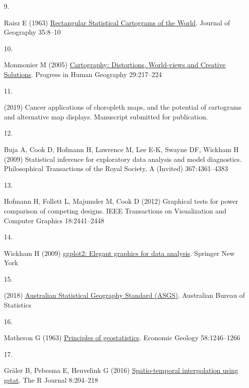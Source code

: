 \documentclass[conference,final,]{IEEEtran}
\newlength{\cslhangindent}
\newlength{\csllabelwidth}
\newlength{\cslentryspacingunit} %
\newenvironment{CSLReferences}[2] %
 {%
  \setlength{\parindent}{0pt}
  \ifodd #1
  \let\oldpar\par
  \def\par{\hangindent=\cslhangindent\oldpar}
  \fi
  \setlength{\parskip}{#2\cslentryspacingunit}
 }%
 {}
\newcommand{\CSLLeftMargin}[1]{\parbox[t]{\csllabelwidth}{#1}}
\newcommand{\CSLRightInline}[1]{\parbox[t]{\linewidth - \csllabelwidth}{#1}\break}
\begin{document}
\begin{CSLReferences}{0}{0}
\leavevmode{}%
\CSLLeftMargin{9. }%
\CSLRightInline{Raisz E (1963) \href{https://doi.org/10.1080/00221343608987880}{{Rectangular Statistical Cartograms of the World}}. Journal of Geography 35:8--10}

\leavevmode{}%
\CSLLeftMargin{10. }%
\CSLRightInline{Monmonier M (2005) \href{https://doi.org/10.1191/0309132505ph540pr}{{Cartography: Distortions, World-views and Creative Solutions}}. Progress in Human Geography 29:217--224}

\leavevmode{}%
\CSLLeftMargin{11. }%
\CSLRightInline{(2019) Cancer applications of choropleth maps, and the potential of cartograms and alternative map displays. Manuscript submitted for publication. }

\leavevmode{}%
\CSLLeftMargin{12. }%
\CSLRightInline{Buja A, Cook D, Hofmann H, Lawrence M, Lee E-K, Swayne DF, Wickham H (2009) Statistical inference for exploratory data analysis and model diagnostics. Philosophical Transactions of the Royal Society, A (Invited) 367:4361--4383}

\leavevmode{}%
\CSLLeftMargin{13. }%
\CSLRightInline{Hofmann H, Follett L, Majumder M, Cook D (2012) Graphical tests for power comparison of competing designs. IEEE Transactions on Visualization and Computer Graphics 18:2441--2448}

\leavevmode{}%
\CSLLeftMargin{14. }%
\CSLRightInline{Wickham H (2009) \href{http://had.co.nz/ggplot2/book}{ggplot2: Elegant graphics for data analysis}. Springer New York}

\leavevmode{}%
\CSLLeftMargin{15. }%
\CSLRightInline{(2018) \href{\%7Bhttps://www.abs.gov.au/websitedbs/D3310114.nsf/home/Australian\%20\%20\%20Statistical\%20Geography\%20Standard\%20(ASGS)\%7D}{{Australian Statistical Geography Standard (ASGS)}}. Australian Bureau of Statistics }

\leavevmode{}%
\CSLLeftMargin{16. }%
\CSLRightInline{Matheron G (1963) \href{http://dx.doi.org/10.2113/gsecongeo.58.8.1246}{Principles of geostatistics}. Economic Geology 58:1246--1266}

\leavevmode{}%
\CSLLeftMargin{17. }%
\CSLRightInline{Gräler B, Pebesma E, Heuvelink G (2016) \href{https://journal.r-project.org/archive/2016/RJ-2016-014/index.html}{Spatio-temporal interpolation using gstat}. The R Journal 8:204--218}


\end{CSLReferences}
\end{document}
